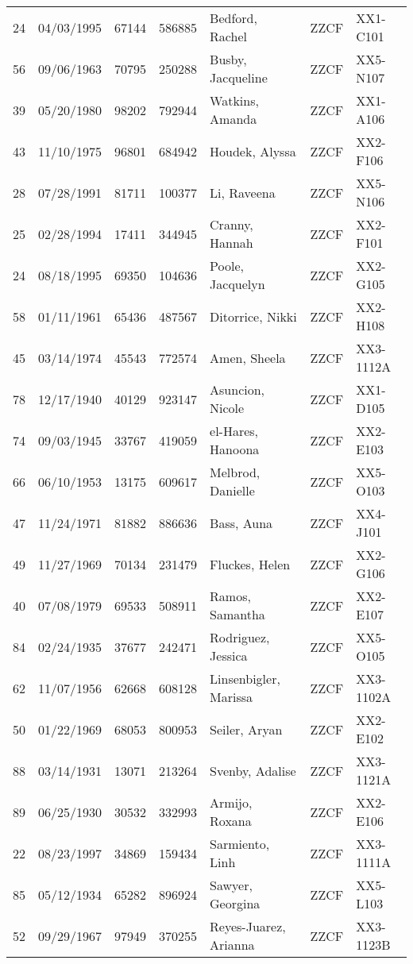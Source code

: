\documentclass[]{article}
\begin{document}
\begin{tabular}{cccclll}
   24 & 04/03/1995 & 67144 & 586885 & Bedford, Rachel & ZZCF & XX1-C101 \\ 
   56 & 09/06/1963 & 70795 & 250288 & Busby, Jacqueline & ZZCF & XX5-N107 \\ 
   39 & 05/20/1980 & 98202 & 792944 & Watkins, Amanda & ZZCF & XX1-A106 \\ 
   43 & 11/10/1975 & 96801 & 684942 & Houdek, Alyssa & ZZCF & XX2-F106 \\ 
   28 & 07/28/1991 & 81711 & 100377 & Li, Raveena & ZZCF & XX5-N106 \\ 
   25 & 02/28/1994 & 17411 & 344945 & Cranny, Hannah & ZZCF & XX2-F101 \\ 
   24 & 08/18/1995 & 69350 & 104636 & Poole, Jacquelyn & ZZCF & XX2-G105 \\ 
   58 & 01/11/1961 & 65436 & 487567 & Ditorrice, Nikki & ZZCF & XX2-H108 \\ 
   45 & 03/14/1974 & 45543 & 772574 & Amen, Sheela & ZZCF & XX3-1112A \\ 
   78 & 12/17/1940 & 40129 & 923147 & Asuncion, Nicole & ZZCF & XX1-D105 \\ 
   74 & 09/03/1945 & 33767 & 419059 & el-Hares, Hanoona & ZZCF & XX2-E103 \\ 
   66 & 06/10/1953 & 13175 & 609617 & Melbrod, Danielle & ZZCF & XX5-O103 \\ 
   47 & 11/24/1971 & 81882 & 886636 & Bass, Auna & ZZCF & XX4-J101 \\ 
   49 & 11/27/1969 & 70134 & 231479 & Fluckes, Helen & ZZCF & XX2-G106 \\ 
   40 & 07/08/1979 & 69533 & 508911 & Ramos, Samantha & ZZCF & XX2-E107 \\ 
   84 & 02/24/1935 & 37677 & 242471 & Rodriguez, Jessica & ZZCF & XX5-O105 \\ 
   62 & 11/07/1956 & 62668 & 608128 & Linsenbigler, Marissa & ZZCF & XX3-1102A \\ 
   50 & 01/22/1969 & 68053 & 800953 & Seiler, Aryan & ZZCF & XX2-E102 \\ 
   88 & 03/14/1931 & 13071 & 213264 & Svenby, Adalise & ZZCF & XX3-1121A \\ 
   89 & 06/25/1930 & 30532 & 332993 & Armijo, Roxana & ZZCF & XX2-E106 \\ 
   22 & 08/23/1997 & 34869 & 159434 & Sarmiento, Linh & ZZCF & XX3-1111A \\ 
   85 & 05/12/1934 & 65282 & 896924 & Sawyer, Georgina & ZZCF & XX5-L103 \\ 
   52 & 09/29/1967 & 97949 & 370255 & Reyes-Juarez, Arianna & ZZCF & XX3-1123B \\ 

\end{tabular}
\end{document}
